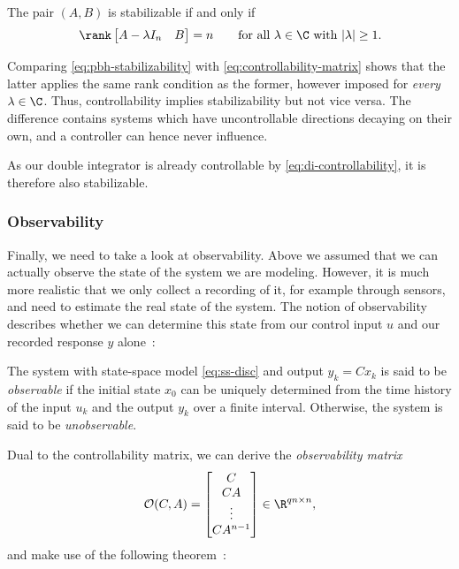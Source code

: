 \begin{theorem}
\label{thm:pbh-stabilizability}
The pair $(A, B)$ is stabilizable if and only if
\begin{equation}
    \label{eq:pbh-stabilizability}
    \rank \begin{bmatrix} A - \lambda I_n & B \end{bmatrix} = n
    \qquad \text{for all } \lambda \in \C \text{ with } \lvert \lambda \rvert \ge 1 .
\end{equation}
\end{theorem}

Comparing \eqref{eq:pbh-stabilizability} with
\eqref{eq:controllability-matrix} shows that the latter
applies the same rank condition as the former, however 
imposed for \emph{every} $\lambda \in \C$. 
Thus, controllability implies stabilizability but not vice versa. 
The difference contains systems which have uncontrollable
directions decaying on their own, and a controller can hence never
influence.

As our double integrator is already controllable by \eqref{eq:di-controllability},
it is therefore also stabilizable.

\subsubsection{Observability}
\label{subsubsec:observability}

Finally, we need to take a look at observability. Above we assumed that we can
actually observe the state of the system we are modeling. However, it is much
more realistic that we only collect a recording of it, for example through
sensors, and need to estimate the real state of the
system. The notion of observability describes whether we can determine this
state from our control input $u$ and our recorded response $y$ alone~:

\begin{definition}[Observability]
\label{def:observability}
The system with state-space model \eqref{eq:ss-disc} and output $y_k = C x_k$
is said to be \emph{observable} if the initial state $x_0$ can be uniquely
determined from the time history of the input $u_k$ and the output $y_k$ over a
finite interval. Otherwise, the system is said to be \emph{unobservable}.
\end{definition}

Dual to the controllability matrix, we can derive the \emph{observability
matrix}
\begin{equation}
    \label{eq:observability-matrix}
    \mathcal{O}(C, A) =
    \begin{bmatrix} C \\ CA \\ \vdots \\ CA^{n-1} \end{bmatrix}
    \in \R^{qn \times n},
\end{equation}
and make use of the following theorem~:

